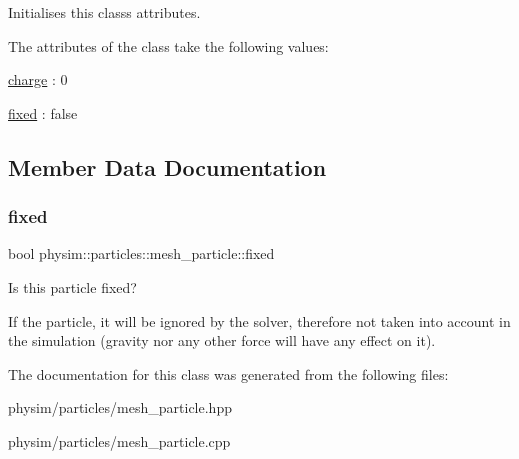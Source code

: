 Initialises this class\textquotesingle{}s attributes. 

The attributes of the class take the following values\+:
\begin{DoxyItemize}
\item \hyperlink{classphysim_1_1particles_1_1mesh__particle_adf14d64e9effa2bcf5cb84a537bd8027}{charge} \+: 0
\item \hyperlink{classphysim_1_1particles_1_1mesh__particle_a5813a57507d8a3539a1534dfd1b74883}{fixed} \+: false 
\end{DoxyItemize}

\subsection{Member Data Documentation}
\mbox{\label{classphysim_1_1particles_1_1mesh__particle_a5813a57507d8a3539a1534dfd1b74883}} 
\subsubsection{\texorpdfstring{fixed}{fixed}}
{\footnotesize\ttfamily bool physim\+::particles\+::mesh\+\_\+particle\+::fixed}



Is this particle fixed? 

If the particle, it will be ignored by the solver, therefore not taken into account in the simulation (gravity nor any other force will have any effect on it). 

The documentation for this class was generated from the following files\+:\begin{DoxyCompactItemize}
\item 
physim/particles/mesh\+\_\+particle.\+hpp\item 
physim/particles/mesh\+\_\+particle.\+cpp\end{DoxyCompactItemize}
